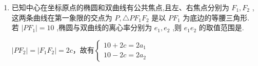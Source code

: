 \begin{enumerate}
\begin{jieda}
        因为$\triangle NF_1F_2$为直角三角形，$ON$为斜边中线，因此有$x_0^2+y_0^2 = c^2$

        又因为$N$在双曲线上，因此有$\dfrac{{x_0}^{2}}{{a}^{2}} - \dfrac{{y_0}^{2}}{{b}^{2}} = 1$

        联立可得$\left\{\begin{array}{l}
             bx_0 = (a+c)y_0  \\
             x_0^2+y_0^2 = c^2 \\
             \dfrac{{x_0}^{2}}{{a}^{2}} - \dfrac{{y_0}^{2}}{{b}^{2}} = 1 \\
             a^2 + b^2 = c^2
        \end{array} \right.$，将第一个式子平方，将第三个式子去分母有$\left\{\begin{array}{l}
             b^2x_0^2 = (a+c)^2y_0^2  \\
             x_0^2+y_0^2 = c^2 \\
             b^2x_0^2 - a^2y_0^2 = a^2b^2 \\
             a^2 + b^2 = c^2
        \end{array} \right.$，消去$b^2$和$x_0^2$可得$\left\{\begin{array}{l}
             a^2(c^2-a^2) + a^2y_0^2 = (a+c)^2y_0^2  \\
             (c^2-a^2)(c^2- y_0^2) - a^2y_0^2 = a^2(c^2-a^2)
        \end{array} \right.$，即$\left\{\begin{array}{l}
             a^2c^2-a^4 = (c^2+2ac)y_0^2  \\
             c^4-y_0^2c^2 = 2a^2c^2-a^4 
        \end{array} \right.$，进一步消去$y_0^2$可得$\dfrac{a^2(c^2-a^2)}{c^2+2ac} = \dfrac{(c^2-a^2)^2}{c^2}$，即$\dfrac{a^2}{c^2+2ac} = \dfrac{c^2-a^2}{c^2}$，即$\dfrac{1}{e^2+2e} = \dfrac{e^2-1}{e^2}$，即$e = (e^2-1)(e+2)$，即$e^3+2e^2-2e-2 = 0$
        
        令$f(x) = x^3+2x^2-2x-2$，$f'(x) = 3x^2+4x-2$，故$f(x)$在$(1, +\infty)$严增，$f(1) = -1 < 0, f(\sqrt{2}) = 2 > 0$，因此选A.
    \end{jieda}
    \item 已知中心在坐标原点的椭圆和双曲线有公共焦点,且左、右焦点分别为 ${F}_{1},{F}_{2}$ ,这两条曲线在第一象限的交点为 $P,\bigtriangleup P{F}_{1}{F}_{2}$ 是以 $P{F}_{1}$ 为底边的等腰三角形. 若 $\left| {P{F}_{1}}\right|  = {10}$ ,椭圆与双曲线的离心率分别为 ${e}_{1},{e}_{2}$ ,则 ${e}_{1}{e}_{2}$ 的取值范围是.
    \begin{jieda}
        $|PF_2| = |F_1F_2| = 2c$，故有$\left\{\begin{array}{l}
             10 + 2c = 2a_1 \\
             10 - 2c = 2a_2 
        \end{array}\right.$
        

\end{jieda}
\end{enumerate}
